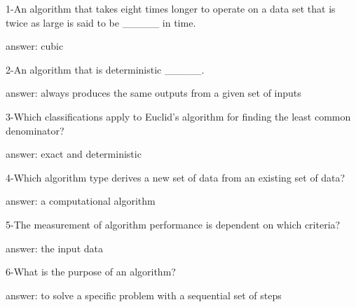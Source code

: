 1-An algorithm that takes eight times longer to operate on a data set that is twice as large is said to be _____ in time.

answer: cubic

2-An algorithm that is deterministic _____.

answer: always produces the same outputs from a given set of inputs

3-Which classifications apply to Euclid's algorithm for finding the least common denominator?

answer: exact and deterministic

4-Which algorithm type derives a new set of data from an existing set of data?


answer: a computational algorithm

5-The measurement of algorithm performance is dependent on which criteria?


answer: the input data

6-What is the purpose of an algorithm?


answer: to solve a specific problem with a sequential set of steps
